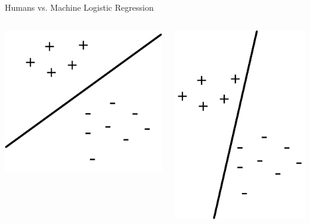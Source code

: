 \documentclass[aspectratio=169]{beamer}
\begin{document}
\begin{frame}{Humans vs. Machine Logistic Regression}

\begin{columns}
\begin{column}{0.5\textwidth}
\includegraphics[width=.85\textwidth]{lectSVM/logR1.pdf}
\end{column}
\begin{column}{0.5\textwidth}
\includegraphics[width=.7\textwidth]{lectSVM/logRegBoundary.pdf}
\end{column}
\end{columns}
\end{frame}
\end{document}
